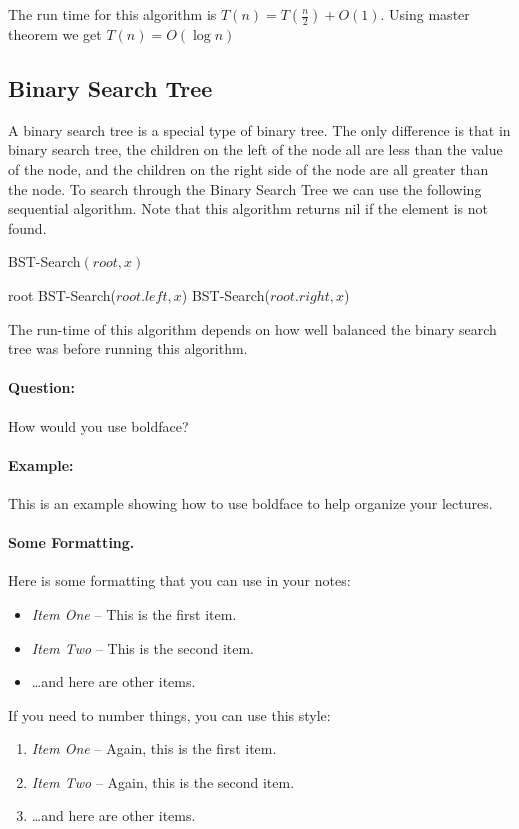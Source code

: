 \documentclass[11pt]{article}
\begin{document}
The run time for this algorithm is $T(n) = T(\frac{n}{2}) + O(1)$. Using master theorem we get $T(n) = O(\log n)$


\subsection{Binary Search Tree}
A binary search tree is a special type of binary tree. The only difference is that in binary search tree, the children on the left of the node all are less than the value of the node, and the children on the right side of the node are all greater than the node. To search through the Binary Search Tree we can use the following sequential algorithm. Note that this algorithm returns nil if the element is not found.

\begin{algorithm}
\caption{BST-Search$(root,x)$}
\begin{algorithmic}
    \RETURN root
    \RETURN BST-Search($root.left,x$)
\ELSE
    \RETURN BST-Search($root.right,x$)
\ENDIF
\end{algorithmic}
\end{algorithm}

The run-time of this algorithm depends on how well balanced the binary search tree was before running this algorithm.

\paragraph{Question:}
How would you use boldface?

\paragraph{Example:}
This is an example showing how to use boldface to
help organize your lectures.


\paragraph{Some Formatting.}
Here is some formatting that you can use in your notes:
\begin{itemize}
\item {\em Item One} -- This is the first item.
\item {\em Item Two} -- This is the second item.
\item \dots and here are other items.
\end{itemize}

If you need to number things, you can use this style:
\begin{enumerate}
\item {\em Item One} -- Again, this is the first item.
\item {\em Item Two} -- Again, this is the second item.
\item \dots and here are other items.
\end{enumerate}

%

\end{document}
